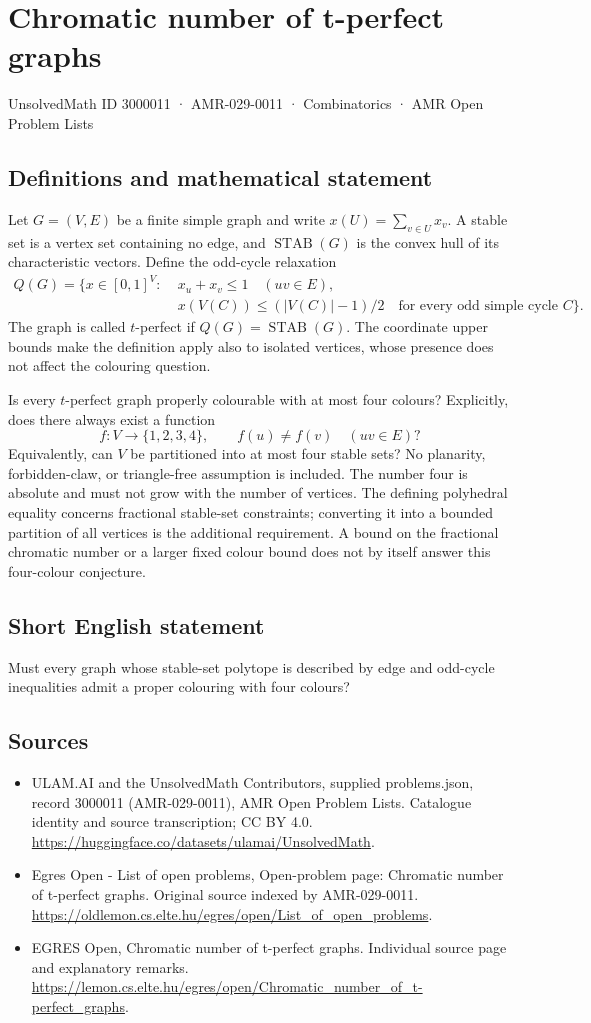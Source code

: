 \documentclass[11pt,a4paper]{article}
\begin{document}
\section*{Chromatic number of t-perfect graphs}\label{3000011}
{\small UnsolvedMath ID 3000011 · AMR-029-0011 · Combinatorics · AMR Open Problem Lists}
\subsection{Definitions and mathematical statement}
Let $G=(V,E)$ be a finite simple graph and write $x(U)=\sum_{v\in U}x_v$.
A stable set is a vertex set containing no edge, and
$\operatorname{STAB}(G)$ is the convex hull of its characteristic vectors.
Define the odd-cycle relaxation
\[
\begin{split}
 Q(G)=\{x\in[0,1]^V:\;&x_u+x_v\le1\quad(uv\in E),\\
 &x(V(C))\le (|V(C)|-1)/2\quad\text{for every odd simple cycle }C\}.
\end{split}
\]
The graph is called $t$-perfect if $Q(G)=\operatorname{STAB}(G)$.
The coordinate upper bounds make the definition apply also to isolated
vertices, whose presence does not affect the colouring question.

Is every $t$-perfect graph properly colourable with at most four colours?
Explicitly, does there always exist a function
\[
                  f:V\longrightarrow\{1,2,3,4\},\qquad
                  f(u)\ne f(v)\quad(uv\in E)?
\]
Equivalently, can $V$ be partitioned into at most four stable sets?
No planarity, forbidden-claw, or triangle-free assumption is included.
The number four is absolute and must not grow with the number of vertices.
The defining polyhedral equality concerns fractional stable-set constraints;
converting it into a bounded partition of all vertices is the additional
requirement. A bound on the fractional chromatic number or a larger fixed
colour bound does not by itself answer this four-colour conjecture.
\subsection{Short English statement}
Must every graph whose stable-set polytope is described by edge
and odd-cycle inequalities admit a proper colouring with four colours?
\subsection{Sources}
\begin{itemize}
\item[S1] ULAM.AI and the UnsolvedMath Contributors, supplied problems.json, record 3000011 (AMR-029-0011), AMR Open Problem Lists. Catalogue identity and source transcription; CC BY 4.0.
\url{https://huggingface.co/datasets/ulamai/UnsolvedMath}.
\item[S2] Egres Open - List of open problems, Open-problem page: Chromatic number of t-perfect graphs. Original source indexed by AMR-029-0011.
\url{https://oldlemon.cs.elte.hu/egres/open/List_of_open_problems}.
\item[S3] EGRES Open, Chromatic number of t-perfect graphs. Individual source page and explanatory remarks.
\url{https://lemon.cs.elte.hu/egres/open/Chromatic_number_of_t-perfect_graphs}.
\end{itemize}
\end{document}
